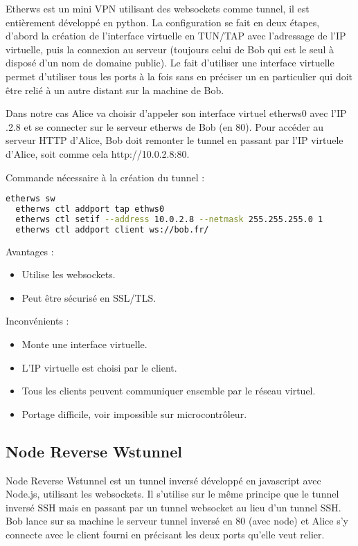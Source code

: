 Etherws est un mini VPN utilisant des websockets comme tunnel, il est entièrement développé en python. La configuration se fait en deux étapes, d'abord la création de l'interface virtuelle en TUN/TAP avec l'adressage de l'IP virtuelle, puis la connexion au serveur (toujours celui de Bob qui est le seul à disposé d'un nom de domaine public). Le fait d'utiliser une interface virtuelle permet d'utiliser tous les ports à la fois sans en préciser un en particulier qui doit être relié à un autre distant sur la machine de Bob.

Dans notre cas Alice va choisir d'appeler son interface virtuel \og etherws0 \fg{} avec l'IP .2.8 \fg{} et se connecter sur le serveur etherws de Bob (en 80). Pour accéder au serveur HTTP d'Alice, Bob doit remonter le tunnel en passant par l'IP virtuele d'Alice, soit comme cela http://10.0.2.8:80.

 Commande nécessaire à la création du tunnel :
\begin{lstlisting}[language=bash]
  etherws sw
  etherws ctl addport tap ethws0
  etherws ctl setif --address 10.0.2.8 --netmask 255.255.255.0 1
  etherws ctl addport client ws://bob.fr/
\end{lstlisting}

Avantages :
\begin{itemize}
    \item Utilise les websockets.
    \item Peut être sécurisé en SSL/TLS.
\end{itemize}

Inconvénients :
\begin{itemize}
    \item Monte une interface virtuelle.
    \item L'IP virtuelle est choisi par le client.
    \item Tous les clients peuvent communiquer ensemble par le réseau virtuel.
    \item Portage difficile, voir impossible sur microcontrôleur.
\end{itemize}

\subsection{Node Reverse Wstunnel}

Node Reverse Wstunnel est un tunnel inversé développé en javascript avec Node.js, utilisant les websockets. Il s'utilise sur le même principe que le tunnel inversé SSH mais en passant par un tunnel websocket au lieu d'un tunnel SSH. Bob lance sur sa machine le serveur tunnel inversé en 80 (avec node) et Alice s'y connecte avec le client fourni en précisant les deux ports qu'elle veut relier.

